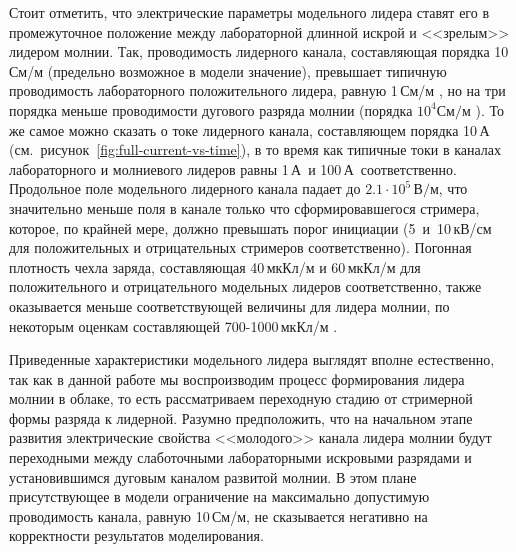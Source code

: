 Стоит отметить, что электрические параметры модельного лидера ставят его в промежуточное положение между лабораторной длинной искрой и <<зрелым>> лидером молнии. Так, проводимость лидерного канала, составляющая порядка 10\,См/м (предельно возможное в модели значение), превышает типичную проводимость лабораторного положительного лидера, равную 1\,См/м \cite{Raizer2009}, но на три порядка меньше проводимости дугового разряда молнии (порядка  $10^4 \text{См}/\text{м}$ \cite{RakovUman2005}). То же самое можно сказать о токе лидерного канала, составляющем порядка 10\,А (см.~рисунок~\ref{fig:full-current-vs-time}), в то время как типичные токи в каналах лабораторного и молниевого лидеров равны 1\,А\,\cite{Raizer2009} и 100\,А\,\cite{RakovUman2005} соответственно. Продольное поле модельного лидерного канала падает до $2.1\cdot 10^5\,\text{В}/\text{м}$, что значительно меньше поля в канале только что сформировавшегося стримера, которое, по крайней мере, должно превышать порог инициации (5~и~10\,кВ/см для положительных и отрицательных стримеров соответственно).  Погонная плотность чехла заряда, составляющая 40\,мкКл/м и 60\,мкКл/м для положительного и отрицательного модельных лидеров соответственно, также оказывается меньше соответствующей величины для лидера молнии, по некоторым оценкам составляющей 700-1000\,мкКл/м \cite{RakovUman2005}.

Приведенные характеристики модельного лидера выглядят вполне естественно, так как в данной работе мы воспроизводим процесс формирования лидера молнии в облаке, то есть рассматриваем переходную стадию от стримерной формы разряда к лидерной. Разумно предположить, что на начальном этапе развития электрические свойства <<молодого>> канала лидера молнии будут переходными между слаботочными лабораторными искровыми разрядами и установившимся дуговым каналом развитой молнии. В этом плане присутствующее в модели ограничение на максимально допустимую проводимость канала, равную 10\,См/м, не сказывается негативно на корректности результатов моделирования.

